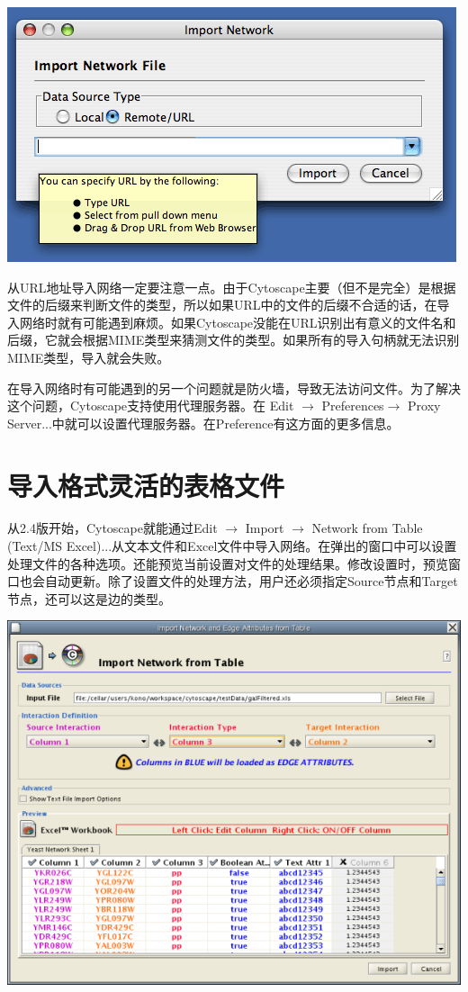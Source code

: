 \begin{center}
 \includegraphics[width=\textwidth]{images/network_import_dialog2_25.png} 
\end{center}

从URL地址导入网络一定要注意一点。由于Cytoscape主要（但不是完全）是根据文件的后缀来判断文件的类型，所以如果URL中的文件的后缀不合适的话，在导入网络时就有可能遇到麻烦。如果Cytoscape没能在URL识别出有意义的文件名和后缀，它就会根据MIME类型来猜测文件的类型。如果所有的导入句柄就无法识别MIME类型，导入就会失败。

在导入网络时有可能遇到的另一个问题就是防火墙，导致无法访问文件。为了解决这个问题，Cytoscape支持使用代理服务器。在 Edit $\rightarrow$ Preferences$\rightarrow$ Proxy Server...中就可以设置代理服务器。在Preference有这方面的更多信息。

\section{导入格式灵活的表格文件}
从2.4版开始，Cytoscape就能通过Edit $\rightarrow$ Import $\rightarrow$ Network from Table (Text/MS Excel)...从文本文件和Excel文件中导入网络。在弹出的窗口中可以设置处理文件的各种选项。还能预览当前设置对文件的处理结果。修改设置时，预览窗口也会自动更新。除了设置文件的处理方法，用户还必须指定Source节点和Target节点，还可以这是边的类型。

\begin{center}
 \includegraphics[width=\textwidth]{images/network_table_import.png} 
\end{center}

